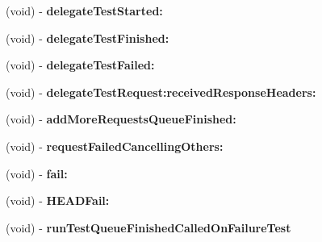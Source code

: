 \begin{DoxyCompactItemize}
\item 
\hypertarget{interface_a_s_i_network_queue_tests_07_08_ad63bd013de90e522e12f2bba603c20d7}{
(void) -\/ {\bfseries delegate\-Test\-Started\-:}}
\label{interface_a_s_i_network_queue_tests_07_08_ad63bd013de90e522e12f2bba603c20d7}

\item 
\hypertarget{interface_a_s_i_network_queue_tests_07_08_aa05a6ec84d2a71b363573187e70a6afa}{
(void) -\/ {\bfseries delegate\-Test\-Finished\-:}}
\label{interface_a_s_i_network_queue_tests_07_08_aa05a6ec84d2a71b363573187e70a6afa}

\item 
\hypertarget{interface_a_s_i_network_queue_tests_07_08_a3b74243c00c86e888ffc9cb271138dcb}{
(void) -\/ {\bfseries delegate\-Test\-Failed\-:}}
\label{interface_a_s_i_network_queue_tests_07_08_a3b74243c00c86e888ffc9cb271138dcb}

\item 
\hypertarget{interface_a_s_i_network_queue_tests_07_08_a46a23624618c0547cbcbb9ca82c798cb}{
(void) -\/ {\bfseries delegate\-Test\-Request\-:received\-Response\-Headers\-:}}
\label{interface_a_s_i_network_queue_tests_07_08_a46a23624618c0547cbcbb9ca82c798cb}

\item 
\hypertarget{interface_a_s_i_network_queue_tests_07_08_abe54bb28f6c58b48f2e136adebe7591c}{
(void) -\/ {\bfseries add\-More\-Requests\-Queue\-Finished\-:}}
\label{interface_a_s_i_network_queue_tests_07_08_abe54bb28f6c58b48f2e136adebe7591c}

\item 
\hypertarget{interface_a_s_i_network_queue_tests_07_08_ac13a2a0cfd430c066079f46e968de949}{
(void) -\/ {\bfseries request\-Failed\-Cancelling\-Others\-:}}
\label{interface_a_s_i_network_queue_tests_07_08_ac13a2a0cfd430c066079f46e968de949}

\item 
\hypertarget{interface_a_s_i_network_queue_tests_07_08_a672f203e09f2d4f39fb2f1824cd85443}{
(void) -\/ {\bfseries fail\-:}}
\label{interface_a_s_i_network_queue_tests_07_08_a672f203e09f2d4f39fb2f1824cd85443}

\item 
\hypertarget{interface_a_s_i_network_queue_tests_07_08_abebd73c6087a317cf7d40a0694fa0554}{
(void) -\/ {\bfseries \-H\-E\-A\-D\-Fail\-:}}
\label{interface_a_s_i_network_queue_tests_07_08_abebd73c6087a317cf7d40a0694fa0554}

\item 
\hypertarget{interface_a_s_i_network_queue_tests_07_08_a863286b45c212a9aff1fd8c9415e8eb8}{
(void) -\/ {\bfseries run\-Test\-Queue\-Finished\-Called\-On\-Failure\-Test}}
\label{interface_a_s_i_network_queue_tests_07_08_a863286b45c212a9aff1fd8c9415e8eb8}


\end{DoxyCompactItemize}

